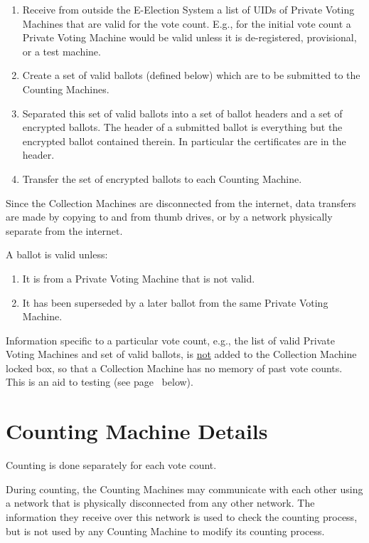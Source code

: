 \documentclass[12pt]{article}
\newcommand{\pagref}[1]{(see page~\pageref{#1} below)}
\begin{document}
\begin{enumerate}
\setcounter{enumi}{\value{CMC-COUNTER}}
\item Receive from outside the E-Election System a list of UIDs of
Private Voting Machines that are valid for the vote count.
E.g., for the initial vote count a Private Voting Machine would
be valid unless it is de-registered, provisional, or a test machine.
\item Create a set of valid ballots (defined below)
which are to be submitted to the Counting Machines.
\item Separated this set of valid ballots into a set of ballot headers
and a set of encrypted ballots.  The header of a submitted ballot is
everything but the encrypted ballot contained therein.  In particular
the certificates are in the header.
\item Transfer the set of encrypted ballots to each Counting Machine.
\end{enumerate}

Since the Collection Machines are disconnected from the internet,
data transfers are made by copying to and from thumb drives, or by
a network physically separate from the internet.

A ballot is valid unless:

\begin{enumerate}
\item It is from a Private Voting Machine that is not valid.
\item It has been superseded by a later ballot from the same
Private Voting Machine.
\end{enumerate}

Information specific to a particular vote count, e.g., the
list of valid Private Voting Machines and set of valid ballots,
is \underline{not} added to the Collection Machine locked box,
so that a Collection Machine has no memory of past vote counts.
This is an aid to testing \pagref{TESTING}.

\section{Counting Machine Details}

Counting is done separately for each vote count.

During counting, the Counting Machines may communicate with
each other using a network that is physically disconnected
from any other network.  The information they receive over this
network is used to check the counting process, but is not used
by any Counting Machine to modify its counting process.
\end{document}

